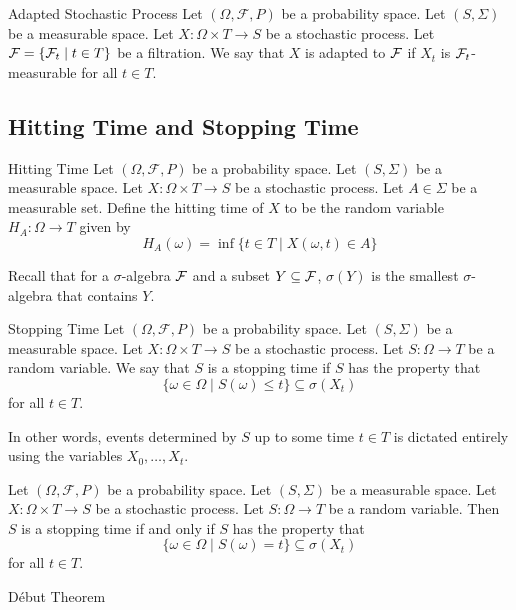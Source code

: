 \documentclass[a4paper]{article}
\begin{document}
\begin{defn}{Adapted Stochastic Process}{} Let $(\Omega,\mathcal{F},P)$ be a probability space. Let $(S,\Sigma)$ be a measurable space. Let $X:\Omega\times T\to S$ be a stochastic process. Let $\mathcal{F}=\{\mathcal{F}_t\;|\;t\in T\}$ be a filtration. We say that $X$ is adapted to $\mathcal{F}$ if $X_t$ is $\mathcal{F}_t$-measurable for all $t\in T$. 
\end{defn}

\subsection{Hitting Time and Stopping Time}
\begin{defn}{Hitting Time}{} Let $(\Omega,\mathcal{F},P)$ be a probability space. Let $(S,\Sigma)$ be a measurable space. Let $X:\Omega\times T\to S$ be a stochastic process. Let $A\in\Sigma$ be a measurable set. Define the hitting time of $X$ to be the random variable $H_A:\Omega\to T$ given by $$H_A(\omega)=\inf\{t\in T\;|\;X(\omega,t)\in A\}$$
\end{defn}

Recall that for a $\sigma$-algebra $\mathcal{F}$ and a subset $Y\subseteq\mathcal{F}$, $\sigma(Y)$ is the smallest $\sigma$-algebra that contains $Y$. 

\begin{defn}{Stopping Time}{} Let $(\Omega,\mathcal{F},P)$ be a probability space. Let $(S,\Sigma)$ be a measurable space. Let $X:\Omega\times T\to S$ be a stochastic process. Let $S:\Omega\to T$ be a random variable. We say that $S$ is a stopping time if $S$ has the property that $$\{\omega\in\Omega\;|\;S(\omega)\leq t\}\subseteq\sigma(X_t)$$ for all $t\in T$. 
\end{defn}

In other words, events determined by $S$ up to some time $t\in T$ is dictated entirely using the variables $X_0,\dots,X_t$. 

\begin{lmm}{}{} Let $(\Omega,\mathcal{F},P)$ be a probability space. Let $(S,\Sigma)$ be a measurable space. Let $X:\Omega\times T\to S$ be a stochastic process. Let $S:\Omega\to T$ be a random variable. Then $S$ is a stopping time if and only if $S$ has the property that $$\{\omega\in\Omega\;|\;S(\omega)=t\}\subseteq\sigma(X_t)$$ for all $t\in T$. 
\end{lmm}

\begin{thm}{Début Theorem}{}
\end{thm}
\end{document}
